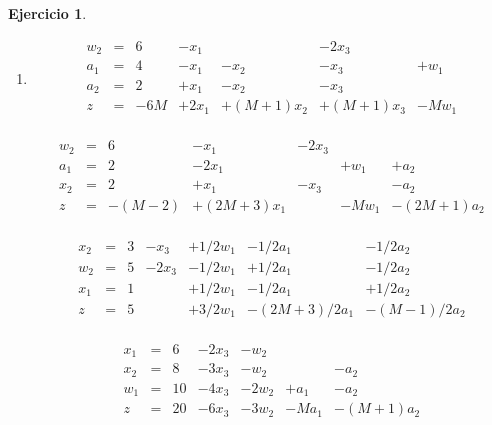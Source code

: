 \documentclass[a4paper,oneside,12pt]{amsart}
\theoremstyle{definition}
\newtheorem{quest}{Ejercicio}
\begin{document}
    \begin{quest}
        \item \begin{enumerate}[label=\alph*)]
                  \item
                  \[
                      \begin{array}{rclllll}
                          w_2 & =  &6 &-x_1 &  &-2x_3 & \\
                          a_1 & =  &4 &-x_1 &-x_2 &-x_3 &+w_1\\
                          a_2 & =  &2 &+x_1 &-x_2 &-x_3 & \\\hline
                          z &= &-6M &+2x_1 &+(M+1)x_2 &+(M+1)x_3 &-Mw_1\\
                      \end{array}
                  \]
                  \vspace{1cm}

                  \[
                      \begin{array}{rclllll}
                          w_2 & =  &6 &-x_1 &-2x_3 &  & \\
                          a_1 & =  &2 &-2x_1 &  &+w_1 &+a_2\\
                          x_2 & =  &2 &+x_1 &-x_3 &  &-a_2\\\hline
                          z &= &-(M-2) &+(2M+3)x_1 &  &-Mw_1 &-(2M+1)a_2\\
                      \end{array}
                  \]
                  \vspace{1cm}

                  \[
                      \begin{array}{rclllll}
                          x_2 & =  &3 &-x_3 &+1/2w_1 &-1/2a_1 &-1/2a_2\\
                          w_2 & =  &5 &-2x_3 &-1/2w_1 &+1/2a_1 &-1/2a_2\\
                          x_1 & =  &1 &  &+1/2w_1 &-1/2a_1 &+1/2a_2\\\hline
                          z &= &5 &  &+3/2w_1 &-(2M+3)/2a_1 &-(M-1)/2a_2\\
                      \end{array}
                  \]
                  \vspace{1cm}

                  \[
                      \begin{array}{rclllll}
                          x_1 & =  &6 &-2x_3 &-w_2 &  & \\
                          x_2 & =  &8 &-3x_3 &-w_2 &  &-a_2\\
                          w_1 & =  &10 &-4x_3 &-2w_2 &+a_1 &-a_2\\\hline
                          z &= &20 &-6x_3 &-3w_2 &-Ma_1 &-(M+1)a_2\\
                      \end{array}
                  \]


\end{enumerate}
\end{quest}
\end{document}
